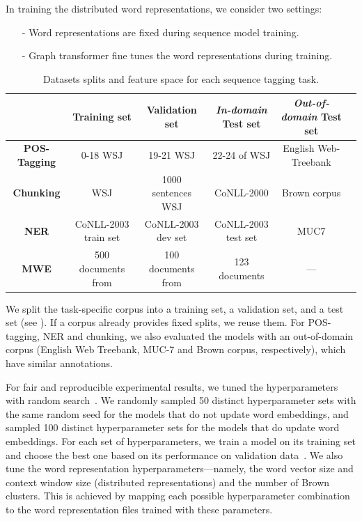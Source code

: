 In training the distributed word representations, we consider two settings: 

\begin{small}
\begin{itemize}
\item[-] Word representations are fixed during sequence model training. 
\item[-] Graph transformer fine tunes the word representations during training. 
\end{itemize}
\end{small}

\begin{table}
\begin{small}
\begin{tabular}{cccccc}
\hline
			& \textbf{Training set} & \textbf{Validation set} & \textbf{\textit{In-domain} Test set} & \textbf{\textit{Out-of-domain} Test set} \\ \hline
\textbf{POS-Tagging} & 0-18 WSJ & 19-21 WSJ & 22-24 of WSJ & English Web-Treebank  \\
\textbf{Chunking} & WSJ & 1000 sentences WSJ & CoNLL-2000 & Brown corpus \\
\textbf{NER} & CoNLL-2003 train set & CoNLL-2003 dev set & CoNLL-2003 test set & MUC7  \\
\textbf{MWE} & 500 documents from & 100 documents from & 123 documents & --- \\
\hline
\end{tabular}
\caption{Datasets splits and feature space for each sequence tagging task.}
\label{datasplit}
\end{small}
\end{table}

We split the task-specific corpus into a training set, a validation set, and a test set (see ). If a corpus already provides fixed splits, we reuse them. For POS-tagging,  NER and chunking, we also evaluated the models with an out-of-domain corpus (English Web Treebank, MUC-7 and Brown corpus, respectively), which have similar annotations.

For fair and reproducible experimental results, we tuned the hyperparameters with random search~\cite{bergstra2012random}. 
We randomly sampled 50 distinct hyperparameter sets with the same random seed for the models that do not update word embeddings, and sampled 100 distinct hyperparameter sets for the models that do update word embeddings. 
For each set of hyperparameters, we train a model on its training set and choose the best one based on its performance on validation data~\cite{turian2010word}. 
We also tune the word representation hyperparameters---namely, the word vector size and context window size (distributed representations) and the number of Brown clusters.
This is achieved by mapping each possible hyperparameter combination to the word representation files trained with these parameters. 

